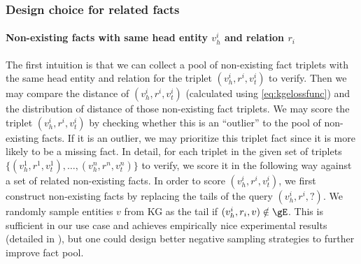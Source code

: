 




\subsubsection{Design choice for related facts}
\paragraph{Non-existing facts with same head entity $v_h^i$ and relation $r_i$}
The first intuition is that we can collect a pool of non-existing fact triplets with the same head entity and relation for the triplet $(v_h^i, r^i, v_t^i)$ to verify. Then we may compare the distance of $(v_h^i, r^i, v_t^i)$ (calculated using \eqref{eq:kgelossfunc}) and the distribution of distance of those non-existing fact triplets. We may score the triplet $(v_h^i, r^i, v_t^i)$ by checking whether this is an ``outlier'' to the pool of non-existing facts. If it is an outlier, we may prioritize this triplet fact since it is more likely to be a missing fact.
In detail, for each triplet in the given set of triplets $\{(v_h^1, r^1, v_t^1), \dots, (v_h^n, r^n, v_t^n)\}$ to verify, we score it in the following way against a set of related non-existing facts.
In order to score $(v_h^i, r^i, v_t^i)$, we first construct non-existing facts by replacing the tails of the query $(v_h^i, r^i, ?)$. We randomly sample entities $v$ from KG as the tail if $(v_h^i, r_i, v) \notin \gE$. This is sufficient in our use case and achieves empirically nice experimental results (detailed in ), but one could design better negative sampling strategies \tocite{} to further improve fact pool. 
